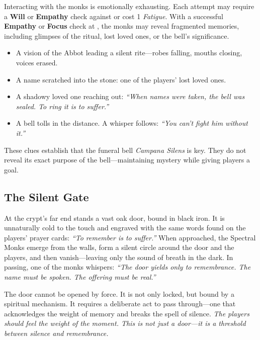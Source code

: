 \documentclass[twocolumn,nodeprecatedcode,bg=print]{dndbook/dndbook}
\begin{document}
Interacting with the monks is emotionally exhausting. Each attempt may require a \textbf{Will} or \textbf{Empathy} check against \Basic or cost 1 \emph{Fatigue}. With a successful \textbf{Empathy} or \textbf{Focus} check at \Difficult, the monks may reveal fragmented memories, including glimpses of the ritual, lost loved ones, or the bell’s significance.

\begin{WyrdExample}
    \begin{itemize}
        \item A vision of the Abbot leading a silent rite—robes falling, mouths closing, voices erased.
        \item A name scratched into the stone: one of the players’ lost loved ones.
        \item A shadowy loved one reaching out: \emph{“When names were taken, the bell was sealed. To ring it is to suffer.”}
        \item A bell tolls in the distance. A whisper follows: \emph{“You can’t fight him without it.”}
    \end{itemize}
\end{WyrdExample}

These clues establish that the funeral bell \emph{Campana Silens} is key. They do not reveal its exact purpose of the bell—maintaining mystery while giving players a goal.

\subsection{The Silent Gate}

At the crypt’s far end stands a vast oak door, bound in black iron. It is unnaturally cold to the touch and engraved with the same words found on the players’ prayer cards: \emph{“To remember is to suffer.”} When approached, the Spectral Monks emerge from the walls, form a silent circle around the door and the players, and then vanish—leaving only the sound of breath in the dark. In passing, one of the monks whispers: \emph{“The door yields only to remembrance. The name must be spoken. The offering must be real.”}

The door cannot be opened by force. It is not only locked, but bound by a spiritual mechanism. It requires a deliberate act to pass through—one that acknowledges the weight of memory and breaks the spell of silence. \emph{The players should feel the weight of the moment. This is not just a door—it is a threshold between silence and remembrance.}
\end{document}

